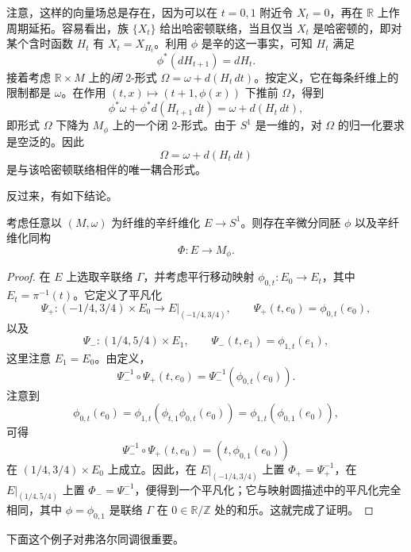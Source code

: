 \begin{example}[映射圆]
注意，这样的向量场总是存在，因为可以在 $t=0,1$ 附近令 $X_t=0$，再在
$\mathbb R$ 上作周期延拓。容易看出，族 $\{X_t\}$ 给出哈密顿联络，当且仅当
$X_t$ 是哈密顿的，即对某个含时函数 $H_t$ 有 $X_t=X_{H_t}$。利用
$\phi$ 是辛的这一事实，可知 $H_t$ 满足
\[
 \phi^*(dH_{t+1})=dH_t.
\]
接着考虑 $\mathbb R\times M$ 上的\emph{闭} $2$-形式
$\Omega=\omega+d(H_t\,dt)$。按定义，它在每条纤维上的限制都是
$\omega$。在作用 $(t,x)\mapsto(t+1,\phi(x))$ 下推前 $\Omega$，得到
\[
 \phi^*\omega+\phi^*d(H_{t+1}\,dt)
 =\omega+d(H_t\,dt),
\]
即形式 $\Omega$ 下降为 $M_\phi$ 上的一个闭 $2$-形式。由于 $S^1$ 是一维的，对 $\Omega$ 的归一化要求是空泛的。因此
\[
 \Omega=\omega+d(H_t\,dt)
\]
是与该哈密顿联络相伴的唯一耦合形式。
\end{example}

反过来，有如下结论。

\begin{theorem}\label{thm:fibration-over-circle-mapping-circle}
考虑任意以 $(M,\omega)$ 为纤维的辛纤维化 $E\to S^1$。则存在辛微分同胚 $\phi$ 以及辛纤维化同构
\[
 \Phi:E\longrightarrow M_\phi.
\]
\end{theorem}

\begin{proof}
在 $E$ 上选取辛联络 $\Gamma$，并考虑平行移动映射
$\phi_{0,t}:E_0\to E_t$，其中 $E_t=\pi^{-1}(t)$。它定义了平凡化
\[
 \Psi_+:(-1/4,3/4)\times E_0\longrightarrow E|_{(-1/4,3/4)},
 \qquad \Psi_+(t,e_0)=\phi_{0,t}(e_0),
\]
以及
\[
 \Psi_-:(1/4,5/4)\times E_1,
 \qquad \Psi_-(t,e_1)=\phi_{1,t}(e_1),
\]
这里注意 $E_1=E_0$。由定义，
\[
 \Psi_-^{-1}\circ\Psi_+(t,e_0)
 =\Psi_-^{-1}(\phi_{0,t}(e_0)).
\]
注意到
\[
 \phi_{0,t}(e_0)
 =\phi_{1,t}(\phi_{t,1}\phi_{0,t}(e_0))
 =\phi_{1,t}(\phi_{0,1}(e_0)),
\]
可得
\[
 \Psi_-^{-1}\circ\Psi_+(t,e_0)=(t,\phi_{0,1}(e_0))
\]
在 $(1/4,3/4)\times E_0$ 上成立。因此，在
$E|_{(-1/4,3/4)}$ 上置 $\Phi_+=\Psi_+^{-1}$，在
$E|_{(1/4,5/4)}$ 上置 $\Phi_-=\Psi_-^{-1}$，便得到一个平凡化；它与映射圆描述中的平凡化完全相同，其中
$\phi=\phi_{0,1}$ 是联络 $\Gamma$ 在 $0\in\mathbb R/\mathbb Z$ 处的和乐。这就完成了证明。
\end{proof}

下面这个例子对弗洛尔同调很重要。

